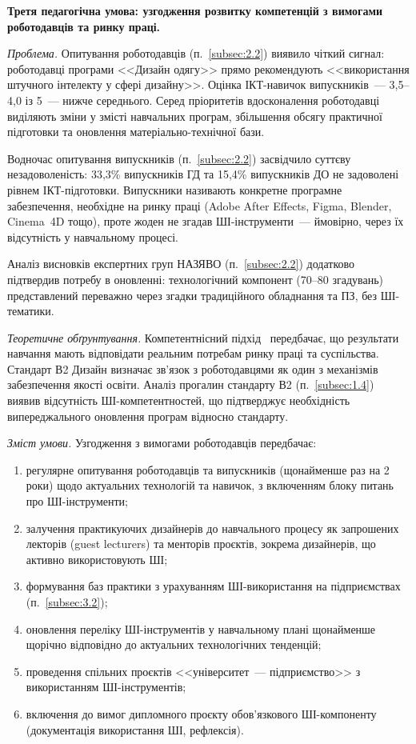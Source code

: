\textbf{Третя педагогічна умова: узгодження розвитку компетенцій з вимогами роботодавців та ринку праці.}

\textit{Проблема.} Опитування роботодавців (п.~\ref{subsec:2.2}) виявило чіткий сигнал: роботодавці програми <<Дизайн одягу>> прямо рекомендують <<використання штучного інтелекту у сфері дизайну>>. Оцінка ІКТ-навичок випускників~--- 3,5--4,0 із 5~--- нижче середнього. Серед пріоритетів вдосконалення роботодавці виділяють зміни у змісті навчальних програм, збільшення обсягу практичної підготовки та оновлення матеріально-технічної бази.

Водночас опитування випускників (п.~\ref{subsec:2.2}) засвідчило суттєву незадоволеність: 33,3\% випускників ГД та 15,4\% випускників ДО не задоволені рівнем ІКТ-підготовки. Випускники називають конкретне програмне забезпечення, необхідне на ринку праці (Adobe After Effects, Figma, Blender, Cinema~4D тощо), проте жоден не згадав ШІ-інструменти~--- ймовірно, через їх відсутність у навчальному процесі.

Аналіз висновків експертних груп НАЗЯВО (п.~\ref{subsec:2.2}) додатково підтвердив потребу в оновленні: технологічний компонент (70--80 згадувань) представлений переважно через згадки традиційного обладнання та ПЗ, без ШІ-тематики.

\textit{Теоретичне обґрунтування.} Компетентнісний підхід~\cite{Musiienko2025DesignEducation} передбачає, що результати навчання мають відповідати реальним потребам ринку праці та суспільства. Стандарт В2 Дизайн визначає зв'язок з роботодавцями як один з механізмів забезпечення якості освіти. Аналіз прогалин стандарту В2 (п.~\ref{subsec:1.4}) виявив відсутність ШІ-компетентностей, що підтверджує необхідність випереджального оновлення програм відносно стандарту.

\textit{Зміст умови.} Узгодження з вимогами роботодавців передбачає:
\begin{enumerate}
    \item регулярне опитування роботодавців та випускників (щонайменше раз на 2 роки) щодо актуальних технологій та навичок, з включенням блоку питань про ШІ-інструменти;
    \item залучення практикуючих дизайнерів до навчального процесу як запрошених лекторів (guest lecturers) та менторів проєктів, зокрема дизайнерів, що активно використовують ШІ;
    \item формування баз практики з урахуванням ШІ-використання на підприємствах (п.~\ref{subsec:3.2});
    \item оновлення переліку ШІ-інструментів у навчальному плані щонайменше щорічно відповідно до актуальних технологічних тенденцій;
    \item проведення спільних проєктів <<університет~--- підприємство>> з використанням ШІ-інструментів;
    \item включення до вимог дипломного проєкту обов'язкового ШІ-компоненту (документація використання ШІ, рефлексія).
\end{enumerate}

